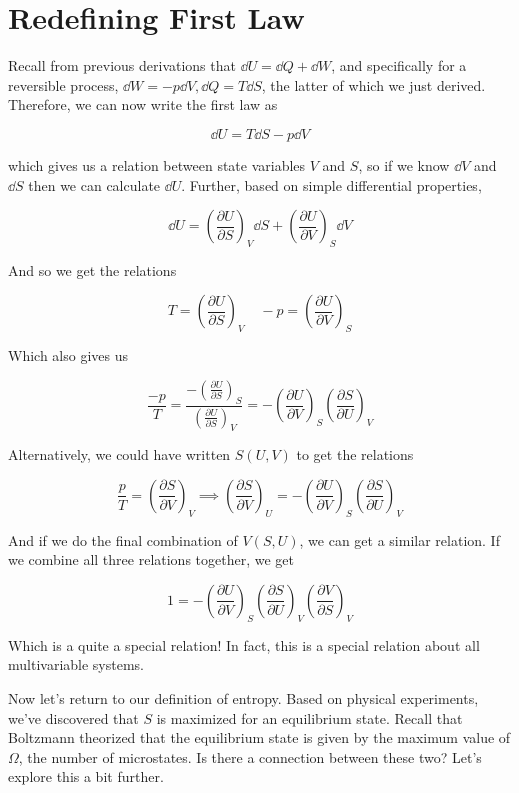 \section{Redefining First Law}

Recall from previous derivations that $\dd U = \dd Q + \dd W$, and specifically for a reversible process, $\dd W = -p \dd V, \dd Q = T \dd S$, the latter of which we just derived. Therefore, we can now write the first law as

\[ \dd U = T \dd S - p \dd V\]

which gives us a relation between state variables $V$ and $S$, so if we know $\dd V$ and $\dd S$ then we can calculate $\dd U$. Further, based on simple differential properties, 

\[ \dd U = \left(\frac{\partial U}{\partial S}\right)_V \dd S + \left(\frac{\partial U}{\partial V}\right)_S \dd V\] 

And so we get the relations 

\[ T = \left(\frac{\partial U}{\partial S}\right)_V \phantom{aa} -p = \left(\frac{\partial U}{\partial V}\right)_S\]

Which also gives us 

\[ \frac{-p}{T} = \frac{-\left(\frac{\partial U}{\partial S}\right)_S}{\left(\frac{\partial U}{\partial S}\right)_V} = -\left(\frac{\partial U}{\partial V}\right)_S\left(\frac{\partial S}{\partial U}\right)_V\] 

\begin{insight*}{}
    Alternatively, we could have written $S(U, V)$ to get the relations

    \[ \frac{p}{T} = \left(\frac{\partial S}{\partial V}\right)_V \implies \left(\frac{\partial S}{\partial V}\right)_U = -\left(\frac{\partial U}{\partial V}\right)_S\left(\frac{\partial S}{\partial U}\right)_V\] 

    And if we do the final combination of $V(S, U)$, we can get a similar relation. If we combine all three relations together, we get

    \[ 1 = -\left(\frac{\partial U}{\partial V}\right)_S \left(\frac{\partial S}{\partial U}\right)_V \left(\frac{\partial V}{\partial S}\right)_V\] 

    Which is a quite a special relation! In fact, this is a special relation about all multivariable systems. 
\end{insight*}

Now let's return to our definition of entropy. Based on physical experiments, we've discovered that $S$ is maximized for an equilibrium state. Recall that Boltzmann theorized that the equilibrium state is given by the maximum value of $\Omega$, the number of microstates. Is there a connection between these two? Let's explore this a bit further. 

